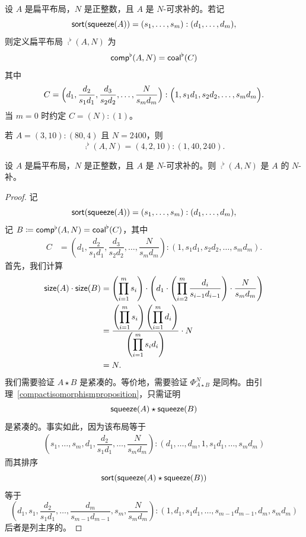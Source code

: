 \begin{construction}\label{Ncomplementconstruction}
    设 $A$ 是扁平布局，$N$ 是正整数，且 $A$ 是 $N$-可求补的。若记
    \[\mathsf{sort}(\mathsf{squeeze}(A)) = (s_1,\dots,s_m):(d_1,\dots,d_m),\]
    则定义扁平布局 $\comp^\flat(A,N)$ 为
    \[
    \mathsf{comp}^\flat(A,N) = \mathsf{coal}^\flat(C)
    \]
    其中
    \[C = \Bigl(d_1 , \dfrac{d_2}{s_1d_1} , \dfrac{d_3}{s_2d_2} , \dots ,\dfrac{N}{s_md_m} \Bigr) : \Bigl(1 , s_1d_1 , s_2d_2, \dots ,s_md_m \Bigr).
    \]
    当 $m=0$ 时约定 $C=(N):(1)$。
\end{construction}

\begin{example}
若 $A = (3,10):(80,4)$ 且 $N = 2400$，则
\[
\comp^\flat(A,N) = (4,2,10):(1,40,240).
\]
\end{example}



\begin{lemma}\label{Ncomplementsarecomplements}
    设 $A$ 是扁平布局，$N$ 是正整数，且 $A$ 是 $N$-可求补的。则 $\comp^\flat(A,N)$ 是 $A$ 的 $N$-补。
\end{lemma}

\begin{proof}
    记
    \[\mathsf{sort}(\mathsf{squeeze}(A)) = (s_1,\dots,s_m):(d_1,\dots,d_m),\]
    记 $B\coloneq \mathsf{comp}^\flat(A,N) = \mathsf{coal}^\flat(C)$，其中
    \begin{align*}
    C
    & = \left(d_1 , \dfrac{d_2}{s_1d_1} , \dfrac{d_3}{s_2d_2} , \dots ,\dfrac{N}{s_md_m} \right) : \left(1 , s_1d_1 , s_2d_2, \dots ,s_md_m \right).
    \end{align*}
    首先，我们计算
    \begin{align*}
    \mathsf{size}(A) \cdot \mathsf{size}(B) & = \left(\prod_{i=1}^m s_i \right) \cdot \left( d_1 \cdot \left(\prod_{i=2}^m \dfrac{d_i}{s_{i-1}d_{i-1}}\right) \cdot \dfrac{N}{s_md_m} \right)\\
    & = \dfrac{\left(\displaystyle\prod_{i=1}^m s_i\right)\left(\displaystyle\prod_{i=1}^m d_i \right)}{\left(\displaystyle\prod_{i=1}^m s_id_i \right)} \cdot N \\
    & = N.
    \end{align*}
    我们需要验证 $A \star B$ 是紧凑的。等价地，需要验证 $\Phi_{A \star B}^N$ 是同构。由引理~\ref{compactisomorphismproposition}，只需证明
    \[\mathsf{squeeze}(A)\star \mathsf{squeeze}(B)\]
    是紧凑的。事实如此，因为该布局等于
    \begin{align*}
    \left(s_1,\dots,s_m,d_1,\dfrac{d_2}{s_1d_1},\dots,\dfrac{N}{s_md_m}\right):(d_1,\dots,d_m,1,s_1d_1,\dots, s_md_m)
    \end{align*}
    而其排序
    \[\mathsf{sort}(\mathsf{squeeze}(A)\star \mathsf{squeeze}(B))\] 等于
    \[
    \left(d_1,s_1, \dfrac{d_2}{s_1d_1},\dots, \dfrac{d_m}{s_{m-1}{d_{m-1}}}, s_m , \dfrac{N}{s_md_m}\right):(1,d_1,s_1d_1, \dots ,s_{m-1}d_{m-1}, d_m,s_md_m)
    \]
    后者是列主序的。
\end{proof}


